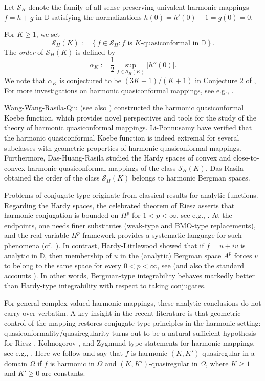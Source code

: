 \documentclass[12pt, reqno]{amsart}
\begin{document}
Let $\mathcal S_H$ denote the family of all sense-preserving univalent harmonic mappings
$f=h+\overline g$ in $\mathbb D$ satisfying the normalizations
$h(0)=h'(0)-1=g(0)=0.$

For $K\ge 1$, we set
\[
\mathcal S_H(K):=\left\{f\in\mathcal S_H: f \text{ is } K\text{-quasiconformal in }\mathbb D\right\}.
\]
The \emph{order} of $\mathcal S_H(K)$ is defined by
\[
\alpha_K:=\frac{1}{2}\sup_{f\in\mathcal S_H(K)}|h''(0)|.
\] 
We note that $\alpha_K$ is conjectured to be ${(3K+1)}/{(K+1)}$ in Conjecture 2 of \cite{wwrq},
For more investigations on harmonic quasiconformal mappings, see e.g., \cite{cp,p,LZ,whlk,wsj}.

Wang-Wang-Rasila-Qiu \cite{wwrq} (see also \cite{wqr}) constructed the harmonic quasiconformal Koebe function, which provides novel perspectives and tools for the study of the theory of harmonic quasiconformal mappings. Li-Ponnusamy \cite{lp} have verified that the harmonic quasiconformal Koebe function is indeed extremal for several subclasses with geometric properties of harmonic quasiconformal mappings. Furthermore, Das-Huang-Rasila \cite{dhr} studied the Hardy spaces of convex and close-to-convex harmonic quasiconformal mappings of the class $\mathcal S_H(K)$, Das-Rasila \cite{DR} obtained the order of the class $\mathcal S_H(K)$ belongs to harmonic Bergman spaces.


Problems of conjugate type originate from classical results for analytic functions.
Regarding the Hardy spaces, the celebrated theorem of Riesz asserts that harmonic conjugation is bounded on $H^p$
for $1<p<\infty$, see e.g., \cite{DP1}.
At the endpoints, one needs finer substitutes (weak-type and BMO-type replacements),
and the real-variable $H^p$ framework provides a systematic language for such phenomena (cf.\ \cite{DP1,FS}).
In contrast, Hardy-Littlewood showed that if $f=u+iv$ is analytic in $\mathbb D$, then
membership of $u$ in the (analytic) Bergman space $A^p$ forces $v$ to belong to the same space for every
$0<p<\infty$, see \cite{HL} (and also the standard accounts \cite{DS,ZK}).
In other words, Bergman-type integrability behaves markedly better than Hardy-type integrability
with respect to taking conjugates.

For general complex-valued harmonic mappings, these analytic conclusions do not carry over verbatim.
A key insight in the recent literature is that geometric control of the mapping restores
conjugate-type principles in the harmonic setting:
quasiconformality/quasiregularity turns out to be a natural sufficient hypothesis for Riesz-, Kolmogorov-, and Zygmund-type statements for harmonic mappings, see e.g., \cite{AK,CHWX,CK,DHR,KD1,KD2}.
Here we follow \cite{CK} and say that $f$ is {harmonic $(K,K')$-quasiregular} in a domain $\Omega$
if $f$ is harmonic in $\Omega$ and $(K,K')$-quasiregular in $\Omega$, where $K\ge1$ and $K'\ge0$ are constants.
\end{document}
